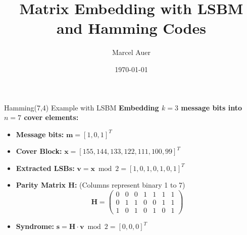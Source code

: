 \documentclass{beamer}
\title{Matrix Embedding with LSBM and Hamming Codes}
\author{Marcel Auer}
\date{\today}
\begin{document}
\begin{frame}
    \titlepage
\end{frame}

\begin{frame}{Hamming(7,4) Example with LSBM}
    \textbf{Embedding $k=3$ message bits into $n=7$ cover elements:}
    \vspace{0.5em}

    \begin{itemize}
        \item \textbf{Message bits:} $\mathbf{m} = [1, 0, 1]^T$
        \item \textbf{Cover Block:} $\mathbf{x} = [155, 144, 133, 122, 111, 100, 99]^T$
        \item \textbf{Extracted LSBs:} $\mathbf{v} = \mathbf{x} \bmod 2 = [1, 0, 1, 0, 1, 0, 1]^T$
        \item \textbf{Parity Matrix $\mathbf{H}$:} (Columns represent binary 1 to 7)
        \[
        \mathbf{H} = \begin{pmatrix}
        0 & 0 & 0 & 1 & 1 & 1 & 1 \\
        0 & 1 & 1 & 0 & 0 & 1 & 1 \\
        1 & 0 & 1 & 0 & 1 & 0 & 1
        \end{pmatrix}
        \]
        \item \textbf{Syndrome:} $\mathbf{s} = \mathbf{H} \cdot \mathbf{v} \bmod 2 = [0, 0, 0]^T$
    \end{itemize}
\end{frame}
\end{document}
